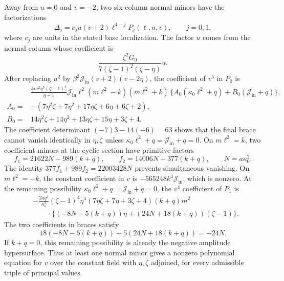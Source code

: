 \documentclass[11pt,a4paper]{article}
\numberwithin{equation}{section}
\theoremstyle{plain}
\theoremstyle{definition}
\theoremstyle{remark}
\begin{document}
Away from $u=0$ and $v=-2$, two six-column normal minors have the
factorizations
\[
 \Delta_j=c_j u(v+2)\ell^{4-j}P_j(\ell,u,v),\qquad j=0,1,
\]
where $c_j$ are units in the stated base localization. The factor $u$
comes from the normal column whose coefficient is
\[
 \frac{\zeta ^2G_0}{7(\zeta -1)^2(\zeta -\eta )}u.
\]
After replacing $u^2$ by $\beta^2\mathcal J_{\mathrm{in}}(v+2)(v-2\eta )$, the coefficient of
$v^5$ in $P_0$ is
\begin{align*}
 &\frac{km^2\eta ^5(\zeta -1)^4}{\eta +1}
 \mathcal J_{\mathrm{in}}\ell^2(m\ell^2-k)(m\ell^2+k)\,
 \{A_0(\kappa_0 \ell^2+q)+B_0(\mathcal J_{\mathrm{in}}+q)\},\\
 A_0={}&-(7\eta ^2\zeta +7\eta ^2+17\eta \zeta +6\eta +6\zeta +2),\\
 B_0={}&14\eta ^2\zeta +14\eta ^2+13\eta \zeta +15\eta +3\zeta +4.
\end{align*}
The coefficient determinant $(-7)3-14(-6)=63$ shows that the final
brace cannot vanish identically in $\eta ,\zeta $ unless
$\kappa_0 \ell^2+q=\mathcal J_{\mathrm{in}}+q=0$. On $m\ell^2=k$, two coefficient minors at the
cyclic section have primitive factors
\[
 f_1=21622N-989(k+q),\qquad
 f_2=14006N+377(k+q),\qquad N=a\kappa_0 ^2.
\]
The identity $377f_1+989f_2=22003428N$ prevents simultaneous
vanishing. On $m\ell^2=-k$, the constant coefficient in $v$ is
$-565248k^4\mathcal J_{\mathrm{in}}$, which is nonzero. At the remaining possibility
$\kappa_0 \ell^2+q=\mathcal J_{\mathrm{in}}+q=0$, the $v^4$ coefficient of $P_1$ is
\begin{align*}
 &-\frac{2aq^3}{\kappa_0 ^2}(\zeta -1)^4\eta ^4(7\eta \zeta +7\eta +3\zeta +4)(k+q)m^2\\
 &\qquad\cdot\{(-8N-5(k+q))\eta +(24N+18(k+q))(\zeta -1)\}.
\end{align*}
The two coefficients in braces satisfy
\[
 18(-8N-5(k+q))+5(24N+18(k+q))=-24N.
\]
If $k+q=0$, this remaining possibility is already the negative
amplitude hypersurface. Thus at least one normal minor gives a
nonzero polynomial equation for $v$ over the constant field with
$\eta ,\zeta $ adjoined, for every admissible triple of principal values.
\end{document}
